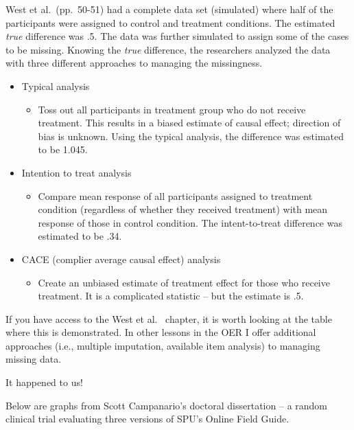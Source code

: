 \documentclass[
  english,
]{book}
\providecommand{\tightlist}{%
  \setlength{\itemsep}{0pt}\setlength{\parskip}{0pt}}
\begin{document}
West et al.~\citeyearpar{reis_causal_2000}(pp.~50-51) had a complete data set (simulated) where half of the participants were assigned to control and treatment conditions. The estimated \emph{true} difference was .5. The data was further simulated to assign some of the cases to be missing. Knowing the \emph{true} difference, the researchers analyzed the data with three different approaches to managing the missingness.

\begin{itemize}
\tightlist
\item
  Typical analysis

  \begin{itemize}
  \tightlist
  \item
    Toss out all participants in treatment group who do not receive treatment. This results in a biased estimate of causal effect; direction of bias is unknown. Using the typical analysis, the difference was estimated to be 1.045.
  \end{itemize}
\item
  Intention to treat analysis

  \begin{itemize}
  \tightlist
  \item
    Compare mean response of all participants assigned to treatment condition (regardless of whether they received treatment) with mean response of those in control condition. The intent-to-treat difference was estimated to be .34.
  \end{itemize}
\item
  CACE (complier average causal effect) analysis

  \begin{itemize}
  \tightlist
  \item
    Create an unbiased estimate of treatment effect for those who receive treatment. It is a complicated statistic -- but the estimate is .5.
  \end{itemize}
\end{itemize}

If you have access to the West et al.~\citeyearpar{reis_causal_2000} chapter, it is worth looking at the table where this is demonstrated. In other lessons in the OER I offer additional approaches (i.e., multiple imputation, available item analysis) to managing missing data.

It happened to us!

Below are graphs from Scott Campanario's doctoral dissertation \citep{campanario_ignatian_2018, campanario_ignatian_2020} -- a random clinical trial evaluating three versions of SPU's Online Field Guide.
\end{document}
